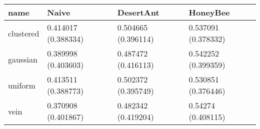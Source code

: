 \begin{tabular} {|l|l|l|l|}
\hline
name & Naive & DesertAnt & HoneyBee \\
\hline
clustered & 0.414017 (0.388334)  & 0.504665 (0.396114)  & 0.537091 (0.378332)  \\
gaussian & 0.389998 (0.403603)  & 0.487472 (0.416113)  & 0.542252 (0.399359)  \\
uniform & 0.413511 (0.388773)  & 0.502372 (0.395749)  & 0.530851 (0.376446)  \\
vein & 0.370908 (0.401867)  & 0.482342 (0.419204)  & 0.54274 (0.408115)  \\
\hline
\end{tabular}
